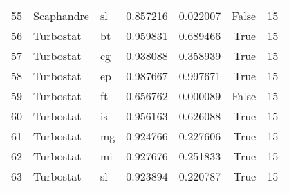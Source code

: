 \begin{tabular}{lllrrrr}
55 & Scaphandre & sl & 0.857216 & 0.022007 & False & 15 \\
56 & Turbostat & bt & 0.959831 & 0.689466 & True & 15 \\
57 & Turbostat & cg & 0.938088 & 0.358939 & True & 15 \\
58 & Turbostat & ep & 0.987667 & 0.997671 & True & 15 \\
59 & Turbostat & ft & 0.656762 & 0.000089 & False & 15 \\
60 & Turbostat & is & 0.956163 & 0.626088 & True & 15 \\
61 & Turbostat & mg & 0.924766 & 0.227606 & True & 15 \\
62 & Turbostat & mi & 0.927676 & 0.251833 & True & 15 \\
63 & Turbostat & sl & 0.923894 & 0.220787 & True & 15 \\
\bottomrule
\end{tabular}
